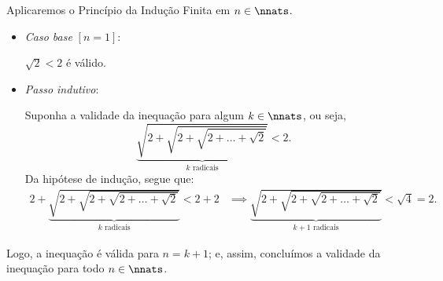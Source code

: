 \begin{solution}
Aplicaremos o Princípio da Indução Finita em $n \in \nnats$.
%
\begin{itemize}
	\item \textit{Caso base} $[n=1]$:

	$\sqrt 2 < 2$ é válido.

	\item \textit{Passo indutivo}:

	Suponha a validade da inequação para algum $k \in \nnats$, ou seja, 
	\begin{equation*}
	\underbrace{\sqrt{2+\sqrt{2+\sqrt{2+ \dots + \sqrt 2}}}}_{k  \text{ radicais}} < 2.
	\end{equation*}
	Da hipótese de indução, segue que:
	\begin{align*}
	2+\underbrace{\sqrt{2+\sqrt{2+\sqrt{2+ \dots + \sqrt 2}}}}_{k  \text{ radicais}} < 2+2 & \implies \underbrace{\sqrt{2+\sqrt{2+\sqrt{2+ \dots + \sqrt 2}}}}_{k+1  \text{ radicais}} < \sqrt 4 = 2.
	\end{align*}
\end{itemize}
%
Logo, a inequação é válida para $n = k+1$; e, assim, concluímos a validade da inequação para todo $n \in \nnats$.
\end{solution}

